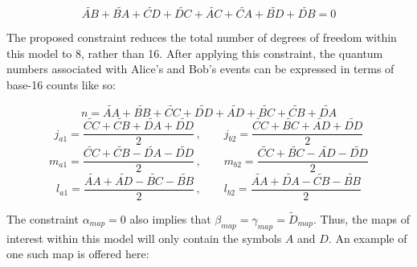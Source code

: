 \documentclass{article}
\begin{document}
\begin{equation}
    \widetilde{AB}+\widetilde{BA}+\widetilde{CD}+\widetilde{DC} + \widetilde{AC}+\widetilde{CA}+\widetilde{BD}+\widetilde{DB} = 0
\end{equation}

The proposed constraint reduces the total number of degrees of freedom within this model to 8, rather than 16. After applying this constraint, the quantum numbers associated with Alice's and Bob's events can be expressed in terms of base-16 counts like so:

\begin{equation}
n=\widetilde{AA}+\widetilde{BB}+\widetilde{CC}+\widetilde{DD}+\widetilde{AD}+\widetilde{BC}+\widetilde{CB}+\widetilde{DA}
\label{eq: n spin addition}
\end{equation}
\begin{equation}
j_{a1}=\frac{\widetilde{CC}+\widetilde{CB}+\widetilde{DA}+\widetilde{DD}}{2}\,,\qquad j_{b2}=\frac{\widetilde{CC}+\widetilde{BC}+\widetilde{AD}+\widetilde{DD}}{2}\label{eq: j spin addition}
\end{equation}
\begin{equation}
m_{a1}=\frac{\widetilde{CC}+\widetilde{CB}-\widetilde{DA}-\widetilde{DD}}{2}\,,\qquad 
m_{b2}=\frac{\widetilde{CC}+\widetilde{BC}-\widetilde{AD}-\widetilde{DD}}{2}\label{eq: m spin addition}
\end{equation}
\begin{equation}
l_{a1}=\frac{\widetilde{AA}+\widetilde{AD}-\widetilde{BC}-\widetilde{BB}}{2}\,,\qquad 
l_{b2}=\frac{\widetilde{AA}+\widetilde{DA}-\widetilde{CB}-\widetilde{BB}}{2}\label{eq: l spin addition}
\end{equation}

The constraint $\alpha_{map}=0$ also implies that $\beta_{map}=\gamma_{map}=\tilde{D}_{map}$. Thus, the maps of interest within this model will only contain the symbols $A$ and $D$. An example of one such map is offered here: 
\end{document}
